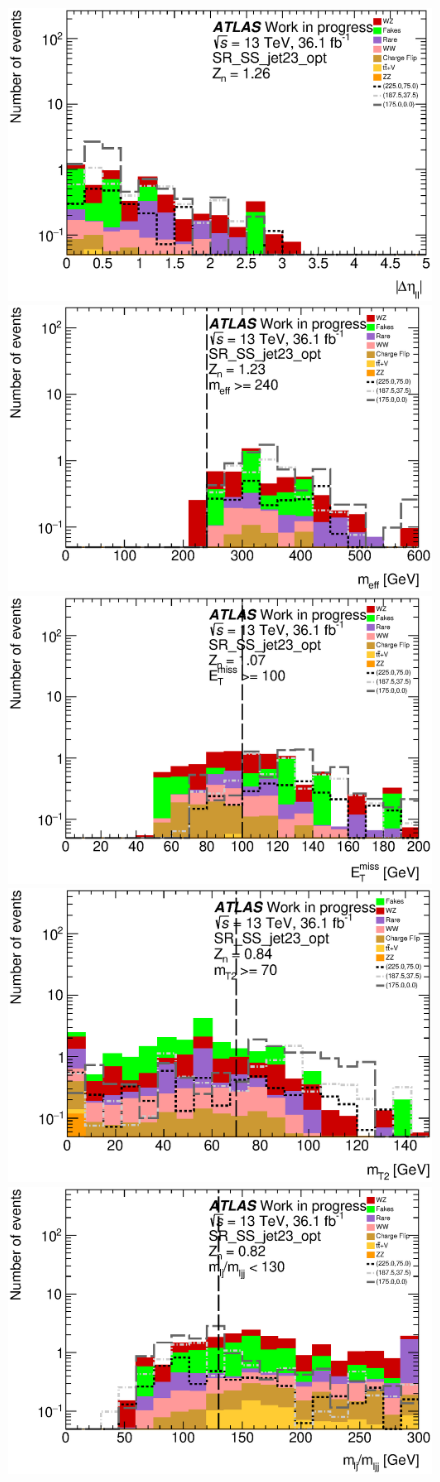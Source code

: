 

\begin{figure}[htpb]
\centering
\includegraphics[width=0.45\linewidth]{data/plot/plot_SR/dEta_SR_SS_jet23_opt_0}
\includegraphics[width=0.45\linewidth]{data/plot/plot_SR/meff_SR_SS_jet23_opt_0}\\
\includegraphics[width=0.45\linewidth]{data/plot/plot_SR/MET_SR_SS_jet23_opt_0}
\includegraphics[width=0.45\linewidth]{data/plot/plot_SR/mTtwo_SR_SS_jet23_opt_0}\\
\includegraphics[width=0.45\linewidth]{data/plot/plot_SR/mlj_SR_SS_jet23_opt_0}

\end{figure}
